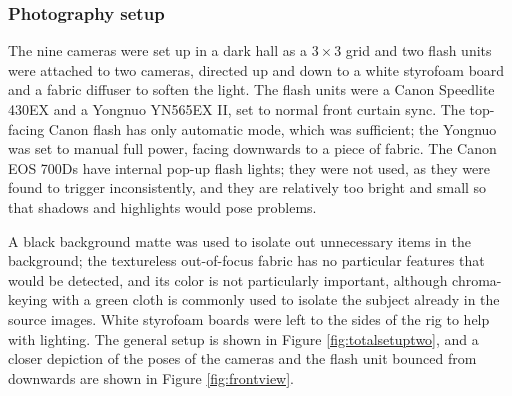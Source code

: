 \subsubsection{Photography setup}

The nine cameras were set up in a dark hall as a $3 \times 3$ grid and two flash units were attached to two cameras, directed up and down to a white styrofoam board and a fabric diffuser to soften the light.
The flash units were a Canon Speedlite 430EX and a Yongnuo YN565EX II, set to normal front curtain sync.
The top-facing Canon flash has only automatic mode, which was sufficient; the Yongnuo was set to manual full power, facing downwards to a piece of fabric.
The Canon EOS 700Ds have internal pop-up flash lights; they were not used, as they were found to trigger inconsistently, and they are relatively too bright and small so that shadows and highlights would pose problems.

A black background matte was used to isolate out unnecessary items in the background;
the textureless out-of-focus fabric has no particular features that would be detected, and its color is not particularly important, although chroma-keying with a green cloth is commonly used to isolate the subject already in the source images.
White styrofoam boards were left to the sides of the rig to help with lighting.
The general setup is shown in Figure \ref{fig:totalsetuptwo}, and a closer depiction of the poses of the cameras and the flash unit bounced from downwards are shown in Figure \ref{fig:frontview}.



%
%


